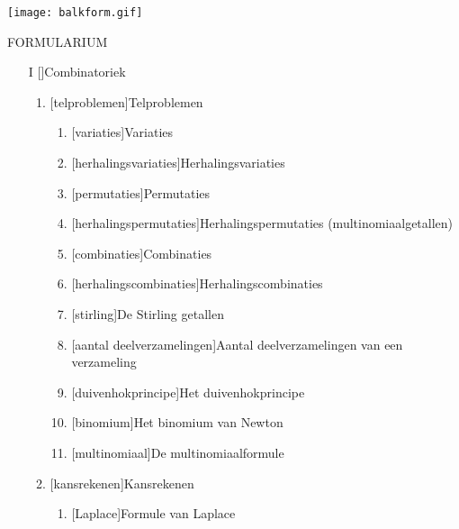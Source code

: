 \documentclass{article}
\begin{document}
{\texttt{[image: balkform.gif]}}
\begin{center}
{\Huge FORMULARIUM}
\end{center}
\newcommand{\Z}{\mbox{$Z \!\! Z$}}
\newcommand{\R}{\mbox{$I\!R$}}
\newcommand{\N}{\mbox{$I\!N$}}
\newcommand{\Q}{\mbox{$\bf Q $}}
\newcommand{\C}{\mbox{$\bf C $}}
\newcommand{\ds}{\displaystyle}
\newcommand{\Frac}[2]{\frac{\ds #1}{\ds #2}}
\begin{itemize}%
\item[I] []{Combinatoriek}
\begin{enumerate}%
\item {}[telproblemen]{Telproblemen}
\begin{enumerate}%
\item {}[variaties]{Variaties}
\item {}[herhalingsvariaties]{Herhalingsvariaties}
\item {}[permutaties]{Permutaties}
\item {}[herhalingspermutaties]{Herhalingspermutaties (multinomiaalgetallen)}
\item {}[combinaties]{Combinaties}
\item {}[herhalingscombinaties]{Herhalingscombinaties}
\item {}[stirling]{De Stirling getallen}
\item {}[aantal deelverzamelingen]{Aantal deelverzamelingen van een verzameling}
\item {}[duivenhokprincipe]{Het duivenhokprincipe}
\item {}[binomium]{Het binomium van Newton}
\item {}[multinomiaal]{De multinomiaalformule}
\end{enumerate}%
\item {}[kansrekenen]{Kansrekenen}
\begin{enumerate}%
\item {}[Laplace]{Formule van Laplace}

\end{enumerate}
\end{enumerate}
\end{itemize}
\end{document}
